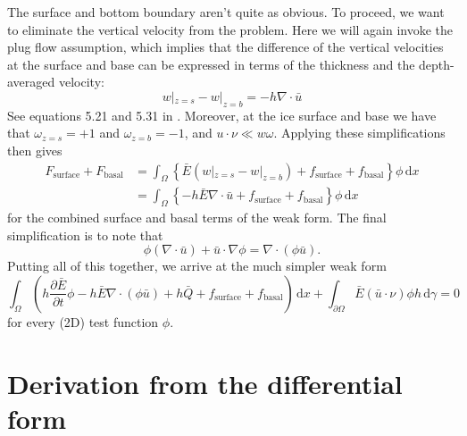 \documentclass{article}
\theoremstyle{definition}
\theoremstyle{plain}
\newcommand{\ud}{\hspace{2pt}\mathrm{d}}
\begin{document}
The surface and bottom boundary aren't quite as obvious.
To proceed, we want to eliminate the vertical velocity from the problem.
Here we will again invoke the plug flow assumption, which implies that the difference of the vertical velocities at the surface and base can be expressed in terms of the thickness and the depth-averaged velocity:
\begin{equation}
    w|_{z = s} - w|_{z = b} = -h\nabla\cdot\bar u
    \label{eq:vertical-velocity-difference}
\end{equation}
See equations 5.21 and 5.31 in \citet{greve2009dynamics}.
Moreover, at the ice surface and base we have that $\omega_{z = s} = +1$ and $\omega_{z = b} = -1$, and $u\cdot \nu \ll w\omega$.
Applying these simplifications then gives
\begin{align}
    F_{\text{surface}} + F_{\text{basal}} & = \int_\Omega \left\{\bar E(w|_{z = s} - w|_{z = b}) + f_{\text{surface}} + f_{\text{basal}}\right\}\phi \ud x \\
    & = \int_\Omega\left\{-h\bar E\nabla\cdot\bar u + f_{\text{surface}} + f_{\text{basal}}\right\}\phi\ud x
\end{align}
for the combined surface and basal terms of the weak form.
The final simplification is to note that
\begin{equation}
    \phi(\nabla\cdot \bar u) + \bar u\cdot\nabla\phi = \nabla\cdot(\phi\bar u).
\end{equation}
Putting all of this together, we arrive at the much simpler weak form
\begin{equation}
    \int_\Omega\left(h\frac{\partial\bar E}{\partial t}\phi - h\bar E\nabla\cdot(\phi\bar u) + h\bar Q + f_{\text{surface}} + f_{\text{basal}}\right)\ud x +\int_{\partial\Omega}\bar E(\bar u\cdot\nu)\phi h\ud\gamma = 0
\end{equation}
for every (2D) test function $\phi$.


\section{Derivation from the differential form}
\end{document}
